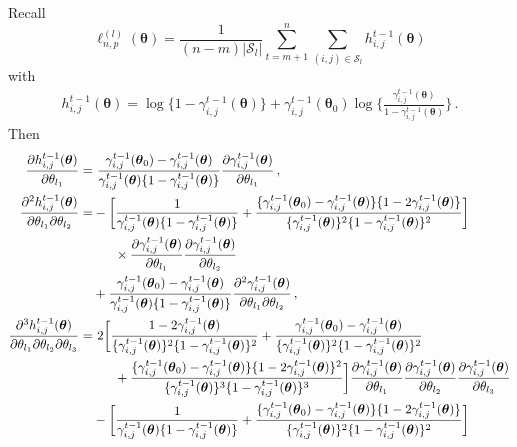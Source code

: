 \documentclass[12pt]{article}
\newcommand{\btheta}{\boldsymbol \theta}
\newcommand{\0}{{\bf 0}}
\begin{document}
Recall 
\[
\ell_{n,p}^{(l)}(\btheta)=\frac{1}{(n-m)|\mathcal{S}_l|}\sum_{t=m+1}^n\sum_{(i,j)\in\mathcal{S}_l}h_{i,j}^{t-1}(\btheta)
\]
with
\begin{align*}
h_{i,j}^{t-1}(\btheta)
=\log \{1- \gamma_{i,j}^{t-1}(\btheta)\}+\gamma_{i,j}^{t-1}(\btheta_0)\log \bigg\{\frac{\gamma_{i,j}^{t-1}(\btheta)}{1- \gamma_{i,j}^{t-1}(\btheta)}\bigg\}\,.
\end{align*}
Then
\begin{align}
\frac{\partial h_{i,j}^{t-1}(\btheta)}{\partial\theta_{l_1}}=&~\frac{\gamma_{i,j}^{t-1}(\btheta_0)-\gamma_{i,j}^{t-1}(\btheta)}{\gamma_{i,j}^{t-1}(\btheta)\{1-\gamma_{i,j}^{t-1}(\btheta)\}}\frac{\partial \gamma_{i,j}^{t-1}(\btheta)}{\partial\theta_{l_1}}\,,\label{eq:h1der}\\
\frac{\partial^2 h_{i,j}^{t-1}(\btheta)}{\partial\theta_{l_1}\partial\theta_{l_2}}=&-\bigg[\frac{1}{\gamma_{i,j}^{t-1}(\btheta)\{1-\gamma_{i,j}^{t-1}(\btheta)\}}+\frac{\{\gamma_{i,j}^{t-1}(\btheta_0)-\gamma_{i,j}^{t-1}(\btheta)\}\{1-2\gamma_{i,j}^{t-1}(\btheta)\}}{\{\gamma_{i,j}^{t-1}(\btheta)\}^2\{1-\gamma_{i,j}^{t-1}(\btheta)\}^2}\bigg]\notag\\
&~~~~~\times\frac{\partial\gamma_{i,j}^{t-1}(\btheta)}{\partial \theta_{l_1}}\frac{\partial\gamma_{i,j}^{t-1}(\btheta)}{\partial \theta_{l_2}}\label{eq:h2der}\\
&+\frac{\gamma_{i,j}^{t-1}(\btheta_0)-\gamma_{i,j}^{t-1}(\btheta)}{\gamma_{i,j}^{t-1}(\btheta)\{1-\gamma_{i,j}^{t-1}(\btheta)\}}\frac{\partial^2\gamma_{i,j}^{t-1}(\btheta)}{\partial\theta_{l_1}\partial\theta_{l_2}}\,,\notag\\
\frac{\partial^3h_{i,j}^{t-1}(\btheta)}{\partial\theta_{l_1}\partial\theta_{l_2}\partial\theta_{l_3}}=&~2\bigg[\frac{1-2\gamma_{i,j}^{t-1}(\btheta)}{\{\gamma_{i,j}^{t-1}(\btheta)\}^2\{1-\gamma_{i,j}^{t-1}(\btheta)\}^2}+\frac{\gamma_{i,j}^{t-1}(\btheta_0)-\gamma_{i,j}^{t-1}(\btheta)}{\{\gamma_{i,j}^{t-1}(\btheta)\}^2\{1-\gamma_{i,j}^{t-1}(\btheta)\}^2}\notag\\
&~~~~~+\frac{\{\gamma_{i,j}^{t-1}(\btheta_0)-\gamma_{i,j}^{t-1}(\btheta)\}\{1-2\gamma_{i,j}^{t-1}(\btheta)\}^2}{\{\gamma_{i,j}^{t-1}(\btheta)\}^3\{1-\gamma_{i,j}^{t-1}(\btheta)\}^3}\bigg]\frac{\partial\gamma_{i,j}^{t-1}(\btheta)}{\partial\theta_{l_1}}\frac{\partial\gamma_{i,j}^{t-1}(\btheta)}{\partial\theta_{l_2}}\frac{\partial\gamma_{i,j}^{t-1}(\btheta)}{\partial\theta_{l_3}}\notag\\
&-\bigg[\frac{1}{\gamma_{i,j}^{t-1}(\btheta)\{1-\gamma_{i,j}^{t-1}(\btheta)\}}+\frac{\{\gamma_{i,j}^{t-1}(\btheta_0)-\gamma_{i,j}^{t-1}(\btheta)\}\{1-2\gamma_{i,j}^{t-1}(\btheta)\}}{\{\gamma_{i,j}^{t-1}(\btheta)\}^2\{1-\gamma_{i,j}^{t-1}(\btheta)\}^2}\bigg]\label{eq:h3der}\\

\end{align}
\end{document}
